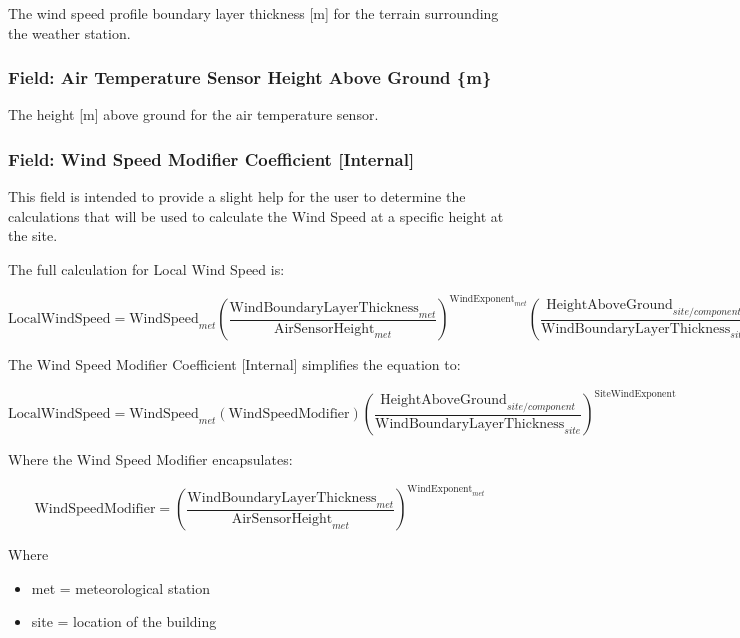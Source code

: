 The wind speed profile boundary layer thickness {[}m{]} for the terrain surrounding the weather station.

\subsubsection{Field: Air Temperature Sensor Height Above Ground \{m\}}\label{field-air-temperature-sensor-height-above-ground-m}

The height {[}m{]} above ground for the air temperature sensor.

\subsubsection{Field: Wind Speed Modifier Coefficient {[}Internal{]}}\label{field-wind-speed-modifier-coefficient-internal}

This field is intended to provide a slight help for the user to determine the calculations that will be used to calculate the Wind Speed at a specific height at the site.

The full calculation for Local Wind Speed is:

\begin{equation}
\text{LocalWindSpeed} = \text{WindSpeed}_{met} \left( \frac{\text{WindBoundaryLayerThickness}_{met}}{\text{AirSensorHeight}_{met}} \right)^{\text{WindExponent}_{met}} \left(\frac{\text{HeightAboveGround}_{site/component}}{\text{WindBoundaryLayerThickness}_{site}}\right)^{\text{SiteWindExponent}}
\end{equation}

The Wind Speed Modifier Coefficient {[}Internal{]} simplifies the equation to:

\begin{equation}
\text{LocalWindSpeed} = \text{WindSpeed}_{met} \left( \text{WindSpeedModifier} \right) \left(\frac{\text{HeightAboveGround}_{site/component}}{\text{WindBoundaryLayerThickness}_{site}}\right)^{\text{SiteWindExponent}}
\end{equation}

Where the Wind Speed Modifier encapsulates:

\begin{equation}
\text{WindSpeedModifier} = \left( \frac{\text{WindBoundaryLayerThickness}_{met}}{\text{AirSensorHeight}_{met}} \right)^{\text{WindExponent}_{met}}
\end{equation}

Where

\begin{itemize}
\tightlist
\item
  met = meteorological station
\item
  site = location of the building
\end{itemize}

